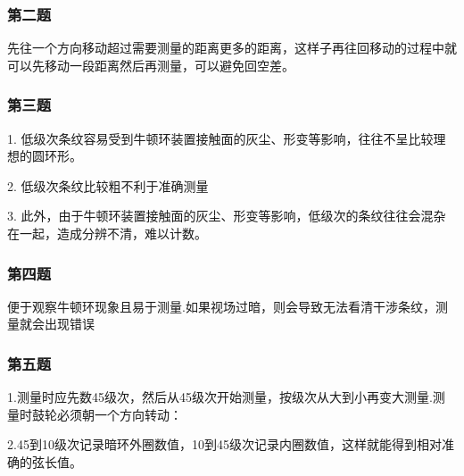\documentclass[12pt,a4paper,UTF8]{ctexart}
\begin{document}
\subsubsection*{第二题}
\par 先往一个方向移动超过需要测量的距离更多的距离，这样子再往回移动的过程中就可以先移动一段距离然后再测量，可以避免回空差。
\subsubsection*{第三题}
\par 1. 低级次条纹容易受到牛顿环装置接触面的灰尘、形变等影响，往往不呈比较理想的圆环形。
\par 2. 低级次条纹比较粗不利于准确测量
\par 3. 此外，由于牛顿环装置接触面的灰尘、形变等影响，低级次的条纹往往会混杂在一起，造成分辨不清，难以计数。
\subsubsection*{第四题}
\par 便于观察牛顿环现象且易于测量.如果视场过暗，则会导致无法看清干涉条纹，测量就会出现错误
\subsubsection*{第五题}
\par 1.测量时应先数45级次，然后从45级次开始测量，按级次从大到小再变大测量.测量时鼓轮必须朝一个方向转动：
\par 2.45到10级次记录暗环外圈数值，10到45级次记录内圈数值，这样就能得到相对准确的弦长值。
\end{document}
